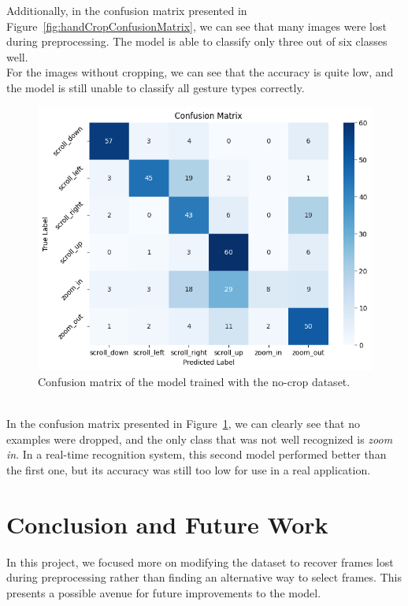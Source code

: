 \documentclass[10pt,twocolumn,letterpaper]{article}
\begin{document}
Additionally, in the confusion matrix presented in Figure~\ref{fig:handCropConfusionMatrix}, 
we can see that many images were lost during preprocessing. 
The model is able to classify only three out of six classes well. \\
For the images without cropping, we can see that the accuracy is quite low, and the model is still unable to classify all gesture types correctly.
\begin{figure}[h]
   \centering
   \includegraphics[width=1\linewidth]{images/matrix_confusion2.png}
   \caption{Confusion matrix of the model trained with the no-crop dataset.}
   \label{fig:noCropConfusionMatrix}
\end{figure} \\
In the confusion matrix presented in Figure~\ref{fig:noCropConfusionMatrix}, we can clearly see that no examples were dropped, and the only class that was not well recognized is \textit{zoom in}.  
In a real-time recognition system, this second model performed better than the first one, but its accuracy was still too low for use in a real application.

\section{Conclusion and Future Work}  
In this project, we focused more on modifying the dataset to recover frames lost during preprocessing rather than finding an alternative way to select frames. This presents a possible avenue for future improvements to the model.  
\end{document}
